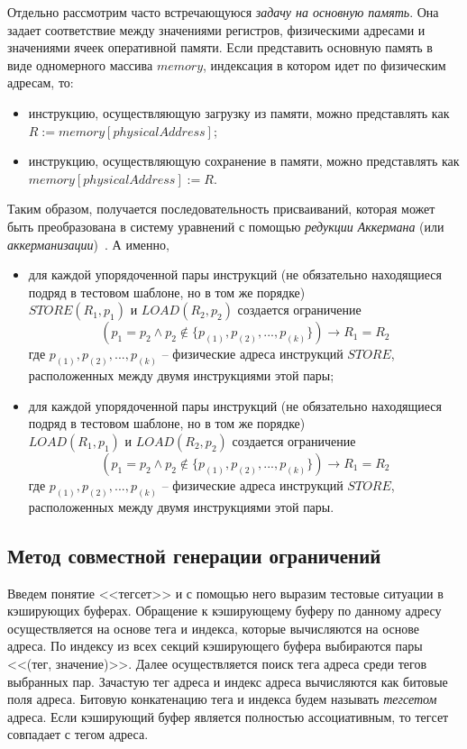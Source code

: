 Отдельно рассмотрим часто встречающуюся \emph{задачу на основную
память}. Она задает соответствие между значениями регистров,
физическими адресами и значениями ячеек оперативной памяти. Если
представить основную память в виде одномерного массива $memory$,
индексация в котором идет по физическим адресам, то:
\begin{itemize}
\item инструкцию, осуществляющую загрузку из памяти,
можно представлять как $R := memory[physicalAddress]$;
\item инструкцию, осуществляющую сохранение в памяти,
можно представлять как $memory[physicalAddress] := R$.
\end{itemize}
Таким образом, получается последовательность присваиваний, которая
может быть преобразована в систему уравнений с помощью
\emph{редукции Аккермана} (или
\emph{аккерманизации})~\cite{Ackermann}. А именно,
\begin{itemize}
\item для каждой упорядоченной пары инструкций (не обязательно
находящиеся подряд в тестовом шаблоне, но в том же порядке)\\
$STORE(R_1, p_1)$ и $LOAD(R_2, p_2)$ создается ограничение $$ (p_1 =
p_2 \wedge p_2 \notin \{ p_{(1)}, p_{(2)}, ..., p_{(k)}\})
\rightarrow R_1 = R_2$$ где $p_{(1)}, p_{(2)}, ..., p_{(k)}$ --
физические адреса инструкций $STORE$, расположенных между двумя
инструкциями этой пары;
\item для каждой упорядоченной пары инструкций (не обязательно
находящиеся подряд в тестовом шаблоне, но в том же порядке)\\
$LOAD(R_1, p_1)$ и $LOAD(R_2, p_2)$ создается ограничение $$ (p_1 =
p_2 \wedge p_2 \notin \{ p_{(1)}, p_{(2)}, ..., p_{(k)}\})
\rightarrow R_1 = R_2$$ где $p_{(1)}, p_{(2)}, ..., p_{(k)}$ --
физические адреса инструкций $STORE$, расположенных между двумя
инструкциями этой пары.
\end{itemize}

\subsection{Метод совместной генерации ограничений}

Введем понятие <<тегсет>> и с помощью него выразим тестовые ситуации
в кэширующих буферах. Обращение к кэширующему буферу по данному
адресу осуществляется на основе тега и индекса, которые вычисляются
на основе адреса. По индексу из всех секций кэширующего буфера
выбираются пары <<(тег, значение)>>. Далее осуществляется поиск тега
адреса среди тегов выбранных пар. Зачастую тег адреса и индекс
адреса вычисляются как битовые поля адреса. Битовую конкатенацию
тега и индекса будем называть \emph{тегсетом} адреса. Если
кэширующий буфер является полностью ассоциативным, то тегсет
совпадает с тегом адреса.

